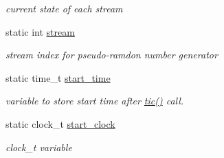 \begin{DoxyCompactItemize}
\begin{DoxyCompactList}\small\item\em current state of each stream \item\end{DoxyCompactList}\item 
\hypertarget{classDMatrix_ad0fa6340a823be80a8ff8334ca4ffa36}{
static int \hyperlink{classDMatrix_ad0fa6340a823be80a8ff8334ca4ffa36}{stream}}
\label{classDMatrix_ad0fa6340a823be80a8ff8334ca4ffa36}

\begin{DoxyCompactList}\small\item\em stream index for pseudo-\/ramdon number generator \item\end{DoxyCompactList}\item 
\hypertarget{classDMatrix_a67f6d06df5d5c3ffc5259b17353af8a2}{
static time\_\-t \hyperlink{classDMatrix_a67f6d06df5d5c3ffc5259b17353af8a2}{start\_\-time}}
\label{classDMatrix_a67f6d06df5d5c3ffc5259b17353af8a2}

\begin{DoxyCompactList}\small\item\em variable to store start time after \hyperlink{classDMatrix_ace51fd7d8435f88c8b2b3bcf64367673}{tic()} call. \item\end{DoxyCompactList}\item 
\hypertarget{classDMatrix_ad01743f08b2cffeaf5e212765adcdda0}{
static clock\_\-t \hyperlink{classDMatrix_ad01743f08b2cffeaf5e212765adcdda0}{start\_\-clock}}
\label{classDMatrix_ad01743f08b2cffeaf5e212765adcdda0}

\begin{DoxyCompactList}\small\item\em clock\_\-t variable \item\end{DoxyCompactList}\end{DoxyCompactItemize}
